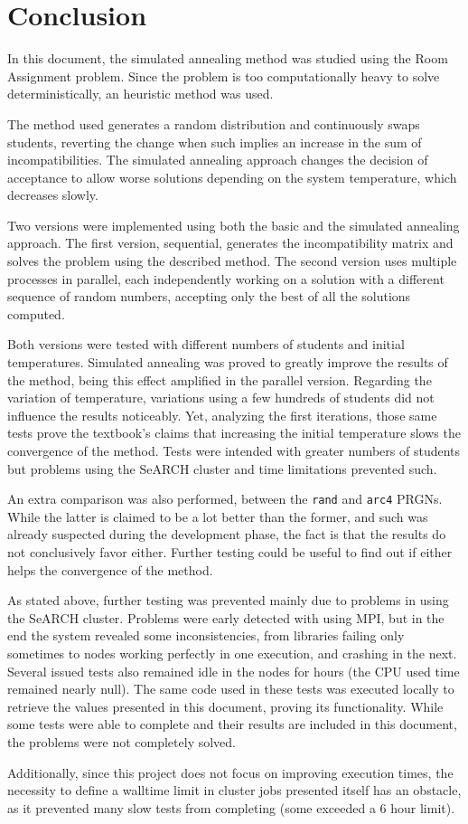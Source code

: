 \section{Conclusion}
\label{sec:conclusion}

In this document, the simulated annealing method was studied using the Room Assignment problem. Since the problem is too computationally heavy to solve deterministically, an heuristic method was used.

The method used generates a random distribution and continuously swaps students, reverting the change when such implies an increase in the sum of incompatibilities. The simulated annealing approach changes the decision of acceptance to allow worse solutions depending on the system temperature, which decreases slowly.

Two versions were implemented using both the basic and the simulated annealing approach. The first version, sequential, generates the incompatibility matrix and solves the problem using the described method. The second version uses multiple processes in parallel, each independently working on a solution with a different sequence of random numbers, accepting only the best of all the solutions computed.

Both versions were tested with different numbers of students and initial temperatures. Simulated annealing was proved to greatly improve the results of the method, being this effect amplified in the parallel version. Regarding the variation of temperature, variations using a few hundreds of students did not influence the results noticeably. Yet, analyzing the first iterations, those same tests prove the textbook's claims that increasing the initial temperature slows the convergence of the method. Tests were intended with greater numbers of students but problems using the SeARCH cluster and time limitations prevented such.

An extra comparison was also performed, between the \texttt{rand} and \texttt{arc4} PRGNs. While the latter is claimed to be a lot better than the former, and such was already suspected during the development phase, the fact is that the results do not conclusively favor either. Further testing could be useful to find out if either helps the convergence of the method.

As stated above, further testing was prevented mainly due to problems in using the SeARCH cluster. Problems were early detected with using MPI, but in the end the system revealed some inconsistencies, from libraries failing only sometimes to nodes working perfectly in one execution, and crashing in the next. Several issued tests also remained idle in the nodes for hours (the CPU used time remained nearly null). The same code used in these tests was executed locally to retrieve the values presented in this document, proving its functionality. While some tests were able to complete and their results are included in this document, the problems were not completely solved.

Additionally, since this project does not focus on improving execution times, the necessity to define a walltime limit in cluster jobs presented itself has an obstacle, as it prevented many slow tests from completing (some exceeded a 6 hour limit).
